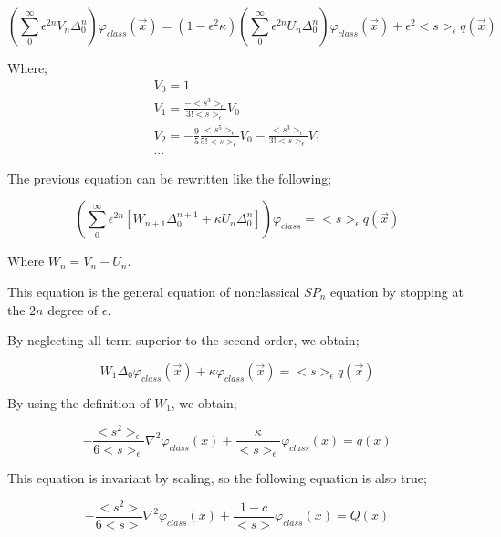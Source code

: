 \documentclass[a4paper, 12pt]{report}
\newcommand{\bl}{\big<}
\newcommand{\bg}{\big>}
\begin{document}
\begin{appendix}
\begin{equation}
\left(\sum_0^\infty \epsilon^{2n}V_n\Delta_0^n \right)\varphi_{class}(\vec{x}) = (1-\epsilon^2\kappa)\left(\sum_0^\infty \epsilon^{2n}U_n\Delta_0^n \right) \varphi_{class}(\vec{x}) + \epsilon^2 \bl s \bg_\epsilon q(\vec{x})
\end{equation}

Where;
\begin{align}
V_0 = 1 \\
V_1 = \frac{-\bl s^3 \bg_\epsilon}{3!\bl s \bg_\epsilon} V_0 \\
V_2 = -\frac{9}{5}\frac{\bl s^5 \bg_\epsilon}{5!\bl s \bg_\epsilon}V_0 - \frac{\bl s^3 \bg_\epsilon}{3! \bl s \bg_\epsilon}V_1 \\
...
\end{align}

The previous equation can be rewritten like the following;

\begin{equation}
\left( \sum_0^\infty \epsilon^{2n} \left[W_{n+1} \Delta_0^{n+1} + \kappa U_n \Delta_0^n \right] \right)\varphi_{class} = \bl s \bg_\epsilon q(\vec{x})
\end{equation}

Where $W_n = V_n - U_n$.

This equation is the general equation of nonclassical $SP_n$ equation by stopping at the $2n$ degree of $\epsilon$.

By neglecting all term superior to the second order, we obtain;

\begin{equation}
W_1 \Delta_0 \varphi_{class}(\vec{x}) + \kappa \varphi_{class}(\vec{x}) =\bl s \bg_\epsilon q(\vec{x})
\end{equation}

By using the definition of $W_1$, we obtain;

\begin{equation}
-\frac{\bl s^2\bg_\epsilon}{6\bl s\bg_\epsilon} \nabla^2 \varphi_{class}(x) + \frac{\kappa}{\bl s\bg_\epsilon} \varphi_{class}(x) = q(x)
\end{equation}

This equation is invariant by scaling, so the following equation is also true;

\begin{equation}
-\frac{\bl s^2\bg}{6\bl s\bg} \nabla^2 \varphi_{class}(x) + \frac{1-c}{\bl s\bg} \varphi_{class}(x) = Q(x)
\end{equation}


\end{appendix}
\end{document}
